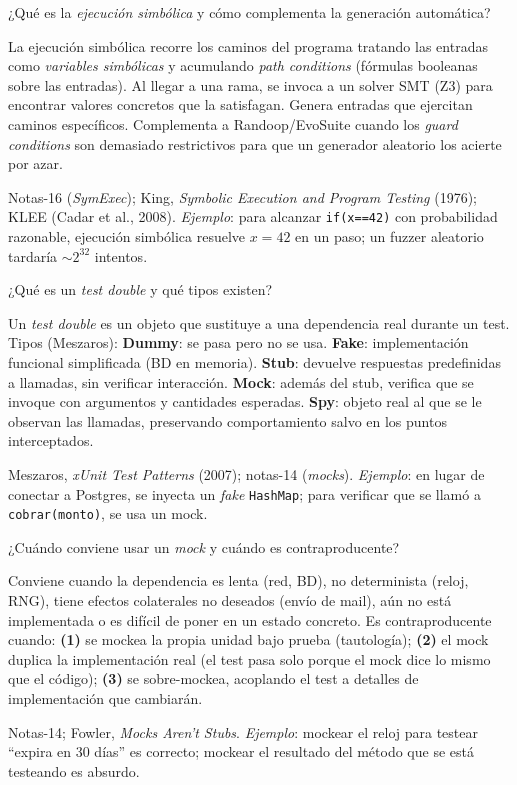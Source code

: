 \documentclass[11pt,a4paper]{article}
\newcounter{preg}
\newcommand{\qa}[3]{%
  \stepcounter{preg}%
  \vspace{0.4em}
  \begin{preguntabox}{\thepreg}
  #1
  \end{preguntabox}
  \begin{respuestabox}
  #2
  \end{respuestabox}
  \begin{refbox}
  #3
  \end{refbox}
  \vspace{0.6em}
}
\begin{document}
\qa{¿Qué es la \emph{ejecución simbólica} y cómo complementa la generación automática?}
{La ejecución simbólica recorre los caminos del programa tratando las entradas como \emph{variables simbólicas} y acumulando \emph{path conditions} (fórmulas booleanas sobre las entradas). Al llegar a una rama, se invoca a un solver SMT (Z3) para encontrar valores concretos que la satisfagan. Genera entradas que ejercitan caminos específicos. Complementa a Randoop/EvoSuite cuando los \emph{guard conditions} son demasiado restrictivos para que un generador aleatorio los acierte por azar.}
{Notas-16 (\emph{SymExec}); King, \emph{Symbolic Execution and Program Testing} (1976); KLEE (Cadar et al., 2008). \emph{Ejemplo}: para alcanzar \texttt{if(x==42)} con probabilidad razonable, ejecución simbólica resuelve $x=42$ en un paso; un fuzzer aleatorio tardaría $\sim 2^{32}$ intentos.}

\qa{¿Qué es un \emph{test double} y qué tipos existen?}
{Un \emph{test double} es un objeto que sustituye a una dependencia real durante un test. Tipos (Meszaros): \textbf{Dummy}: se pasa pero no se usa. \textbf{Fake}: implementación funcional simplificada (BD en memoria). \textbf{Stub}: devuelve respuestas predefinidas a llamadas, sin verificar interacción. \textbf{Mock}: además del stub, verifica que se invoque con argumentos y cantidades esperadas. \textbf{Spy}: objeto real al que se le observan las llamadas, preservando comportamiento salvo en los puntos interceptados.}
{Meszaros, \emph{xUnit Test Patterns} (2007); notas-14 (\emph{mocks}). \emph{Ejemplo}: en lugar de conectar a Postgres, se inyecta un \emph{fake} \texttt{HashMap}; para verificar que se llamó a \texttt{cobrar(monto)}, se usa un mock.}

\qa{¿Cuándo conviene usar un \emph{mock} y cuándo es contraproducente?}
{Conviene cuando la dependencia es lenta (red, BD), no determinista (reloj, RNG), tiene efectos colaterales no deseados (envío de mail), aún no está implementada o es difícil de poner en un estado concreto. Es contraproducente cuando: \textbf{(1)} se mockea la propia unidad bajo prueba (tautología); \textbf{(2)} el mock duplica la implementación real (el test pasa solo porque el mock dice lo mismo que el código); \textbf{(3)} se sobre-mockea, acoplando el test a detalles de implementación que cambiarán.}
{Notas-14; Fowler, \emph{Mocks Aren't Stubs}. \emph{Ejemplo}: mockear el reloj para testear ``expira en 30 días'' es correcto; mockear el resultado del método que se está testeando es absurdo.}
\end{document}
